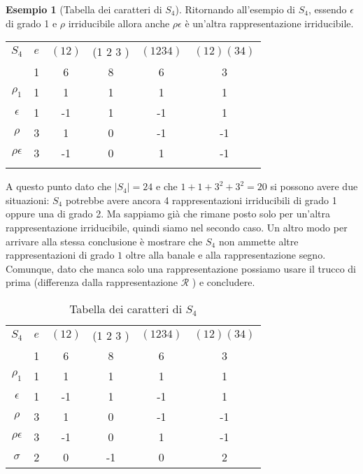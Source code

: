 \documentclass[11pt]{article}
\theoremstyle{plain}
\theoremstyle{definition}
\newtheorem{exmp}{Esempio}[section]
\theoremstyle{remark}
\begin{document}
\begin{exmp}[Tabella dei caratteri di $S_4$]
Ritornando all'esempio di $S_4$, essendo $\epsilon$ di grado 1 e $\rho$ irriducibile allora anche $\rho\epsilon$ è un'altra rappresentazione irriducibile.
\begin{table}[!ht]
\centering
\begin{tabular}{|c|c|c|c|c|c|}
\hline
$S_4$  & $e$ & $(1 2)$ & (1 2 3 ) & $(1 2 3 4)$ & $(1 2)(3 4)$ \\
 & 1 & 6 & 8 & 6 & 3 \\
\hline
 $\rho_1$ & 1 & 1  & 1 & 1 & 1\\
\hline
$\epsilon$ & 1  & -1 & 1 & -1 & 1 \\
\hline
$\rho$& 3 & 1 & 0 & -1 & -1\\
\hline
$\rho\epsilon$& 3 & -1 & 0 & 1 & -1\\
\hline
& &  & & & \\
\hline
\end{tabular}
\end{table}
A questo punto dato che $|S_4|=24$ e che $1+1+3^2+3^2=20$ si possono avere due situazioni: $S_4$ potrebbe avere ancora 4 rappresentazioni irriducibili di grado 1 oppure una di grado 2.
Ma sappiamo già che rimane posto solo per un'altra rappresentazione irriducibile, quindi siamo nel secondo caso.
Un altro modo per arrivare alla stessa conclusione è mostrare che $S_4$ non ammette altre rappresentazioni di grado $1$ oltre alla banale e alla rappresentazione segno.\\
Comunque, dato che manca solo una rappresentazione possiamo usare il trucco di prima (differenza dalla rappresentazione $\mathcal{R}$ ) e concludere.

\begin{table}[!ht]
\centering
\begin{tabular}{|c|c|c|c|c|c|}
\hline
$S_4$  & $e$ & $(1 2)$ & (1 2 3 ) & $(1 2 3 4)$ & $(1 2)(3 4)$ \\
 & 1 & 6 & 8 & 6 & 3 \\
\hline
 $\rho_1$ & 1 & 1  & 1 & 1 & 1\\
\hline
$\epsilon$ & 1  & -1 & 1 & -1 & 1 \\
\hline
$\rho$& 3 & 1 & 0 & -1 & -1\\
\hline
$\rho\epsilon$& 3 & -1 & 0 & 1 & -1\\
\hline
 $\sigma$& 2&  0 & -1& 0 & 2\\
\hline
\end{tabular}
\caption{Tabella dei caratteri di $S_4$}
\label{tabella caratteri s4}
\end{table}



\end{exmp}
\end{document}

